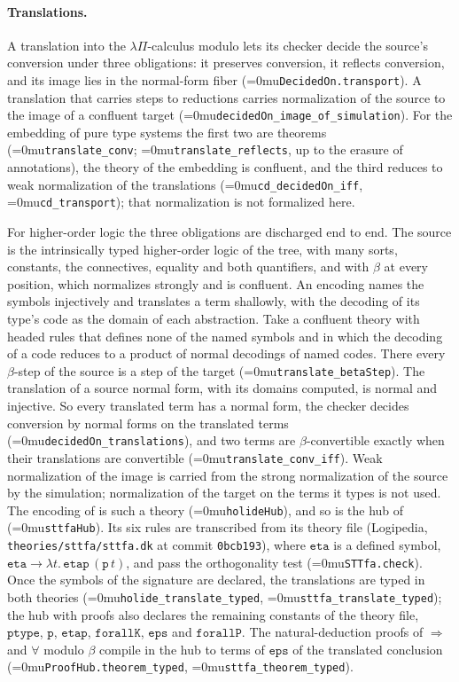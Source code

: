 \documentclass[11pt]{article}
\newcommand{\leanname}[1]{\textup{\Urlmuskip=0mu\relax\nolinkurl{#1}}}
\theoremstyle{definition}
\theoremstyle{remark}
\begin{document}
\paragraph{Translations.}
A translation into the $\lambda\Pi$-calculus modulo lets its checker decide the
source's conversion under three obligations: it preserves conversion, it
reflects conversion, and its image lies in the normal-form fiber
(\leanname{DecidedOn.transport}). A translation that carries steps to
reductions carries normalization of the source to the image of a confluent
target (\leanname{decidedOn_image_of_simulation}). For the embedding of pure
type systems \cite{CousineauDowekPTS} the first two are theorems
(\leanname{translate_conv}; \leanname{translate_reflects}, up to the erasure of
annotations), the theory of the embedding is confluent, and the third reduces
to weak normalization of the translations (\leanname{cd_decidedOn_iff},
\leanname{cd_transport}); that normalization is not formalized here.

For higher-order logic the three obligations are discharged end to end. The
source is the intrinsically typed higher-order logic of the tree, with many
sorts, constants, the connectives, equality and both quantifiers, and with
$\beta$ at every position, which normalizes strongly and is confluent. An
encoding names the symbols injectively and translates a term shallowly, with
the decoding of its type's code as the domain of each abstraction. Take a
confluent theory with headed rules that defines none of the named symbols and
in which the decoding of a code reduces to a product of normal decodings of
named codes. There every $\beta$-step of the source is a step of the target
(\leanname{translate_betaStep}). The translation of a source normal form,
with its domains computed, is normal and injective. So every translated term
has a normal form, the checker decides conversion by normal forms on the
translated terms (\leanname{decidedOn_translations}), and two terms are
$\beta$-convertible exactly when their translations are convertible
(\leanname{translate_conv_iff}). Weak normalization of the image is carried
from the strong normalization of the source by the simulation; normalization
of the target on the terms it types is not used. The encoding of
\cite{AssafBurelHOL} is such a theory (\leanname{holideHub}), and so is the
hub of \cite{DowekThireLogipedia} (\leanname{sttfaHub}). Its six rules are
transcribed from its theory file (Logipedia, \texttt{theories/sttfa/sttfa.dk}
at commit \texttt{0bcb193}), where $\mathtt{eta}$ is a defined symbol,
$\mathtt{eta} \longrightarrow \lambda t.\,\mathtt{etap}\,(\mathtt{p}\,t)$,
and pass the orthogonality test (\leanname{STTfa.check}). Once the symbols of the signature are declared, the
translations are typed in both theories (\leanname{holide_translate_typed},
\leanname{sttfa_translate_typed}); the hub with proofs also declares the
remaining constants of the theory file, $\mathtt{ptype}$, $\mathtt{p}$,
$\mathtt{etap}$, $\mathtt{forallK}$, $\mathtt{eps}$ and $\mathtt{forallP}$.
The natural-deduction proofs of $\Rightarrow$
and $\forall$ modulo $\beta$ compile in the hub to terms of
$\mathtt{eps}$ of the translated conclusion (\leanname{ProofHub.theorem_typed},
\leanname{sttfa_theorem_typed}).
\end{document}
